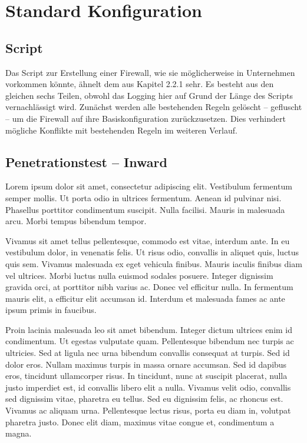 \newpage
\section{Standard Konfiguration}



\subsection{Script}
Das Script zur Erstellung einer Firewall, wie sie möglicherweise in Unternehmen vorkommen könnte, ähnelt dem aus Kapitel 2.2.1 sehr. 
Es besteht aus den gleichen sechs Teilen, obwohl das Logging hier auf Grund der Länge des Scripts vernachlässigt wird.
Zunächst werden alle bestehenden Regeln gelöscht – gefluscht – um die Firewall auf ihre Basiskonfiguration zurückzusetzen. Dies verhindert mögliche Konflikte mit bestehenden Regeln im weiteren Verlauf. 

\subsection{Penetrationstest – Inward}
Lorem ipsum dolor sit amet, consectetur adipiscing elit. Vestibulum fermentum semper mollis. Ut porta odio in ultrices fermentum. Aenean id pulvinar nisi. Phasellus porttitor condimentum suscipit. Nulla facilisi. Mauris in malesuada arcu. Morbi tempus bibendum tempor.

Vivamus sit amet tellus pellentesque, commodo est vitae, interdum ante. In eu vestibulum dolor, in venenatis felis. Ut risus odio, convallis in aliquet quis, luctus quis sem. Vivamus malesuada ex eget vehicula finibus. Mauris iaculis finibus diam vel ultrices. Morbi luctus nulla euismod sodales posuere. Integer dignissim gravida orci, at porttitor nibh varius ac. Donec vel efficitur nulla. In fermentum mauris elit, a efficitur elit accumsan id. Interdum et malesuada fames ac ante ipsum primis in faucibus.

Proin lacinia malesuada leo sit amet bibendum. Integer dictum ultrices enim id condimentum. Ut egestas vulputate quam. Pellentesque bibendum nec turpis ac ultricies. Sed at ligula nec urna bibendum convallis consequat at turpis. Sed id dolor eros. Nullam maximus turpis in massa ornare accumsan. Sed id dapibus eros, tincidunt ullamcorper risus. In tincidunt, nunc at suscipit placerat, nulla justo imperdiet est, id convallis libero elit a nulla. Vivamus velit odio, convallis sed dignissim vitae, pharetra eu tellus. Sed eu dignissim felis, ac rhoncus est. Vivamus ac aliquam urna. Pellentesque lectus risus, porta eu diam in, volutpat pharetra justo. Donec elit diam, maximus vitae congue et, condimentum a magna.
